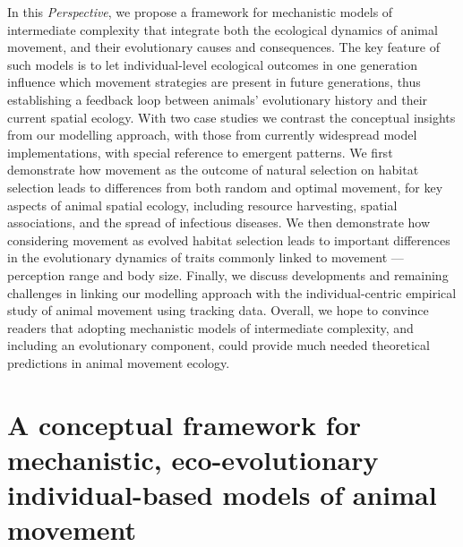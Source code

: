 In this \textit{Perspective}, we propose a framework for mechanistic models of intermediate complexity that integrate both the ecological dynamics of animal movement, and their evolutionary causes and consequences.
The key feature of such models is to let individual-level ecological outcomes in one generation influence which movement strategies are present in future generations, thus establishing a feedback loop between animals' evolutionary history and their current spatial ecology.
With two case studies we contrast the conceptual insights from our modelling approach, with those from currently widespread model implementations, with special reference to emergent patterns.
We first demonstrate how movement as the outcome of natural selection on habitat selection leads to differences from both random and optimal movement, for key aspects of animal spatial ecology, including resource harvesting, spatial associations, and the spread of infectious diseases.
We then demonstrate how considering movement as evolved habitat selection leads to important differences in the evolutionary dynamics of traits commonly linked to movement ---  perception range and body size.
Finally, we discuss developments and remaining challenges in linking our modelling approach with the individual-centric empirical study of animal movement using tracking data.
Overall, we hope to convince readers that adopting mechanistic models of intermediate complexity, and including an evolutionary component, could provide much needed theoretical predictions in animal movement ecology.

\section*{A conceptual framework for mechanistic, eco-evolutionary individual-based models of animal movement}




